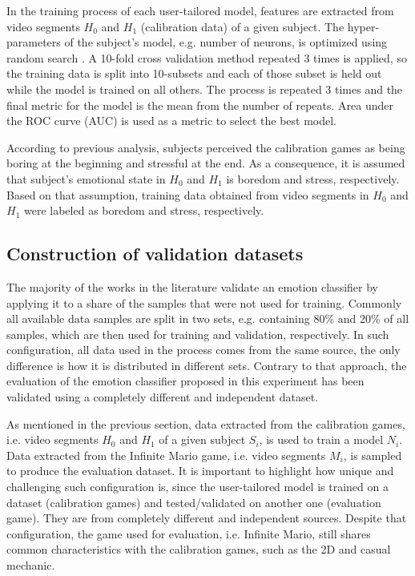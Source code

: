 In the training process of each user-tailored model, features are extracted from video segments $H_0$ and $H_1$ (calibration data) of a given subject. The hyper-parameters of the subject's model, e.g. number of neurons, is optimized using random search \parencite{bergstra2012random}. A 10-fold cross validation method repeated 3 times is applied, so the training data is split into 10-subsets and each of those subset is held out while the model is trained on all others. The process is repeated 3 times and the final metric for the model is the mean from the number of repeats. Area under the ROC curve (AUC) is used as a metric to select the best model.

According to previous analysis, subjects perceived the calibration games as being boring at the beginning and stressful at the end. As a consequence, it is assumed that subject's emotional state in $H_0$ and $H_1$ is boredom and stress, respectively. Based on that assumption, training data obtained from video segments in $H_0$ and $H_1$ were labeled as boredom and stress, respectively.

\subsection{Construction of validation datasets}
\label{sec:experiment2-construction-validation}

The majority of the works in the literature validate an emotion classifier by applying it to a share of the samples that were not used for training. Commonly all available data samples are split in two sets, e.g. containing 80\% and 20\% of all samples, which are then used for training and validation, respectively. In such configuration, all data used in the process comes from the same source, the only difference is how it is distributed in different sets. Contrary to that approach, the evaluation of the emotion classifier proposed in this experiment has been validated using a completely different and independent dataset.

As mentioned in the previous section, data extracted from the calibration games, i.e. video segments $H_0$ and $H_1$ of a given subject $S_i$, is used to train a model $N_i$. Data extracted from the Infinite Mario game, i.e. video segments $M_i$, is sampled to produce the evaluation dataset. It is important to highlight how unique and challenging such configuration is, since the user-tailored model is trained on a dataset (calibration games) and tested/validated on another one (evaluation game). They are from completely different and independent sources. Despite that configuration, the game used for evaluation, i.e. Infinite Mario, still shares common characteristics with the calibration games, such as the 2D and casual mechanic.

